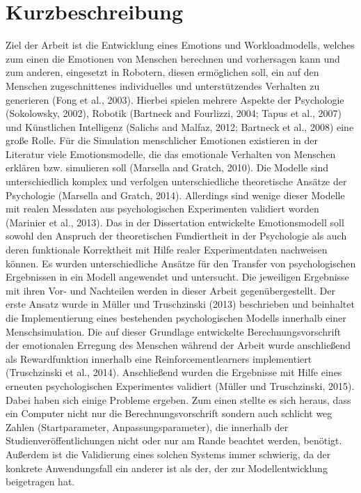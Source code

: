 \chapter{Kurzbeschreibung}
Ziel der Arbeit ist die Entwicklung eines Emotions und Workloadmodells, welches zum einen die Emotionen von
Menschen berechnen und vorhersagen kann und zum anderen, eingesetzt in Robotern, diesen
ermöglichen soll, ein auf den Menschen zugeschnittenes individuelles und unterstützendes Verhalten zu
generieren (Fong et al., 2003). Hierbei spielen mehrere Aspekte der Psychologie (Sokolowsky, 2002),
Robotik (Bartneck and Fourlizzi, 2004; Tapus et al., 2007) und Künstlichen Intelligenz (Salichs and
Malfaz, 2012; Bartneck et al., 2008) eine große Rolle.
Für die Simulation menschlicher Emotionen existieren in der Literatur viele Emotionsmodelle, die das
emotionale Verhalten von Menschen erklären bzw. simulieren soll (Marsella and Gratch, 2010). Die
Modelle sind unterschiedlich komplex und verfolgen unterschiedliche theoretische Ansätze der
Psychologie (Marsella and Gratch, 2014). Allerdings sind wenige dieser Modelle mit realen Messdaten
aus psychologischen Experimenten validiert worden (Marinier et al., 2013). Das in der Dissertation
entwickelte Emotionsmodell soll sowohl den Anspruch der theoretischen Fundiertheit in der
Psychologie als auch deren funktionale Korrektheit mit Hilfe realer Experimentdaten nachweisen
können.
Es wurden unterschiedliche Ansätze für den Transfer von psychologischen Ergebnissen in ein Modell
angewendet und untersucht. Die jeweiligen Ergebnisse mit ihren Vor- und Nachteilen werden in dieser
Arbeit gegenübergestellt.
Der erste Ansatz wurde in Müller und Truschzinski (2013) beschrieben und beinhaltet die
Implementierung eines bestehenden psychologischen Modells innerhalb einer Menschsimulation. Die
auf dieser Grundlage entwickelte Berechnungsvorschrift der emotionalen Erregung des Menschen
während der Arbeit wurde anschließend als Rewardfunktion innerhalb eine Reinforcementlearners
implementiert (Truschzinski et al., 2014). Anschließend wurden die Ergebnisse mit Hilfe eines erneuten
psychologischen Experimentes validiert (Müller und Truschzinski, 2015). Dabei haben sich einige
Probleme ergeben. Zum einen stellte es sich heraus, dass ein Computer nicht nur die
Berechnungsvorschrift sondern auch schlicht weg Zahlen (Startparameter, Anpassungsparameter), die
innerhalb der Studienveröffentlichungen nicht oder nur am Rande beachtet werden, benötigt. Außerdem
ist die Validierung eines solchen Systems immer schwierig, da der konkrete Anwendungsfall ein
anderer ist als der, der zur Modellentwicklung beigetragen hat.
